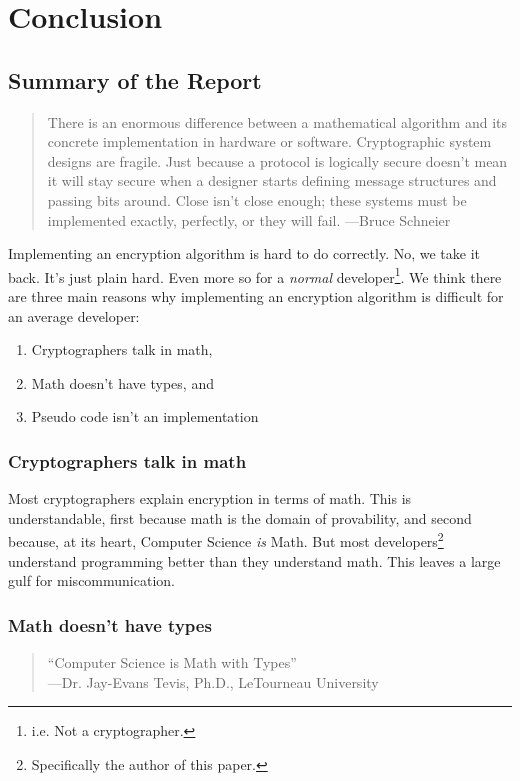 \section{Conclusion}
\label{conclusion}
\subsection{Summary of the Report}

\blockquote[\cite{Schneier:Harder}]{There is an enormous difference between a mathematical algorithm and its concrete implementation in hardware or software. Cryptographic system designs are fragile. Just because a protocol is logically secure doesn't mean it will stay secure when a designer starts defining message structures and passing bits around. Close isn't close enough; these systems must be implemented exactly, perfectly, or they will fail. ---Bruce Schneier}

Implementing an encryption algorithm is hard to do correctly. No, we take it back. It's just plain hard. Even more so for a \emph{normal} developer\footnote{i.e. Not a cryptographer.}. We think there are three main reasons why implementing an encryption algorithm is difficult for an average developer:

\begin{enumerate}
\item Cryptographers talk in math,
\item Math doesn't have types, and
\item Pseudo code isn't an implementation
\end{enumerate}

\subsubsection{Cryptographers talk in math}

Most cryptographers explain encryption in terms of math. This is understandable, first because math is the domain of provability, and second because, at its heart, Computer Science \emph{is} Math. But most developers\footnote{Specifically the author of this paper.} understand programming better than they understand math. This leaves a large gulf for miscommunication.

\subsubsection{Math doesn't have types}
\blockquote{\enquote{Computer Science is Math with Types}\\ ---Dr. Jay-Evans Tevis, Ph.D., LeTourneau University}

